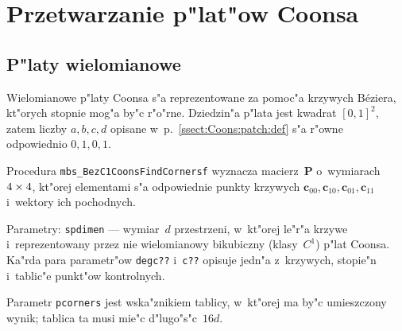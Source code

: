 

\newpage
\section{\label{sect:Coons:patch:procedures}Przetwarzanie p"lat"ow Coonsa}

\subsection{P"laty wielomianowe}

Wielomianowe p"laty Coonsa s"a reprezentowane za pomoc"a krzywych B\'{e}ziera,
kt"orych stopnie mog"a by"c r"o"rne. Dziedzin"a p"lata jest kwadrat $[0,1]^2$,
zatem liczby $a,b,c,d$ opisane w~p.~\ref{ssect:Coons:patch:def} s"a r"owne
odpowiednio $0,1,0,1$.

\vspace{\bigskipamount}
\begin{sloppypar}
Procedura \texttt{mbs\_BezC1CoonsFindCornersf} wyznacza macierz~$\bm{P}$
o~wymiarach $4\times\nobreak 4$, kt"orej elementami s"a odpowiednie punkty
krzywych $\bm{c}_{00},\bm{c}_{10},\bm{c}_{01},\bm{c}_{11}$ i~wektory ich
pochodnych.%
\end{sloppypar}

Parametry: \texttt{spdimen} --- wymiar~$d$ przestrzeni, w~kt"orej le"r"a
krzywe i~reprezentowany przez nie wielomianowy bikubiczny (klasy~$C^1$)
p"lat Coonsa. Ka"rda para parametr"ow \texttt{degc??} i~\texttt{c??}
opisuje jedn"a z~krzywych, stopie"n i~tablic"e punkt"ow kontrolnych.

Parametr \texttt{pcorners} jest wska"znikiem tablicy, w~kt"orej ma by"c
umieszczony wynik; tablica ta musi mie"c d"lugo"s"c~$16d$.

